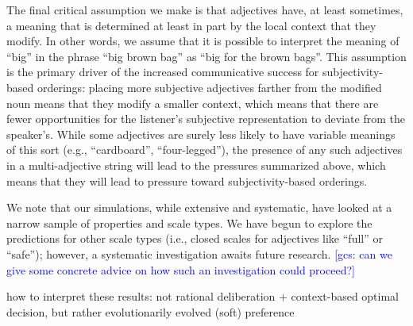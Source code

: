\documentclass[10pt,a4paper]{article}
\newcommand{\gcs}[1]{\textcolor{blue}{[gcs: #1]}}
\begin{document}
The final critical assumption we make is that adjectives have, at least sometimes, a meaning that is determined at least in part by the local context that they modify. In other words, we assume that it is possible to interpret the meaning of ``big''  in the phrase ``big brown bag'' as ``big for the brown bags''. This assumption is the primary driver of the increased communicative success for subjectivity-based orderings: placing more subjective adjectives farther from the modified noun means that they modify a smaller context, which means that there are fewer opportunities for the listener's subjective representation to deviate from the speaker's. While some adjectives are surely less likely to have variable meanings of this sort (e.g., ``cardboard'', ``four-legged''), the presence of any such adjectives in a multi-adjective string will lead to the pressures summarized above, which means that they will lead to pressure toward subjectivity-based orderings.

We note that our simulations, while extensive and systematic, have looked at a narrow sample of properties and scale types. We have begun to explore the predictions for other scale types (i.e., closed scales for adjectives like ``full'' or ``safe''); however, a systematic investigation awaits future research. \gcs{can we give some concrete advice on how such an investigation could proceed?}

how to interpret these results: not rational deliberation + context-based optimal decision, but rather evolutionarily evolved (soft) preference









\setlength{\bibleftmargin}{.125in}
\setlength{\bibindent}{-\bibleftmargin}


\end{document}
